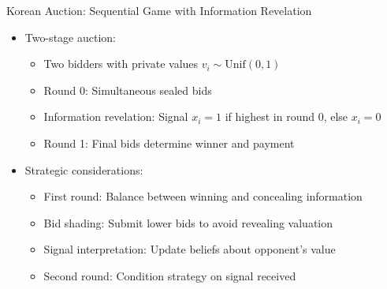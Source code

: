 \documentclass[10pt]{beamer}
\begin{document}

\begin{frame}{Korean Auction: Sequential Game with Information Revelation}
    \begin{itemize}
        \item Two-stage auction:
        \begin{itemize}
            \item Two bidders with private values $v_i \sim \text{Unif}(0,1)$
            \item Round 0: Simultaneous sealed bids
            \item Information revelation: Signal $x_i = 1$ if highest in round 0, else $x_i = 0$
            \item Round 1: Final bids determine winner and payment
        \end{itemize}
        \vspace{0.2cm}
        \item Strategic considerations:
        \begin{itemize}
            \item First round: Balance between winning and concealing information
            \item Bid shading: Submit lower bids to avoid revealing valuation
            \item Signal interpretation: Update beliefs about opponent's value
            \item Second round: Condition strategy on signal received
        \end{itemize}
    \end{itemize}
\end{frame}
\end{document}
